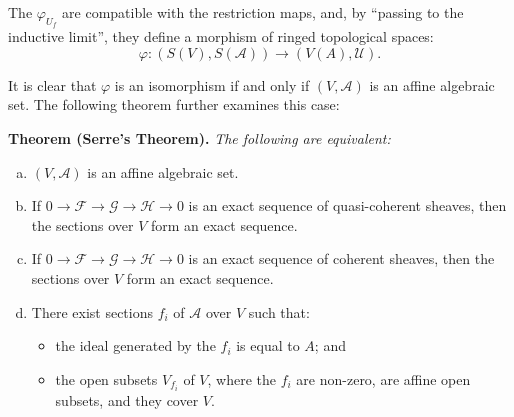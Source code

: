 \documentclass{article}
\newenvironment{itenv}[1]
  {\phantomsection\par\medskip\noindent\textbf{#1.}\itshape}
  {\medskip}
\newcommand{\scr}[1]{{\mathscr{#1}}}
\newcommand{\oldpage}[1]{\marginpar{\footnotesize$\Big\vert$ \textit{p.~#1}}}
\begin{document}
The $\varphi_{U_f}$ are compatible with the restriction maps, and, by ``passing to the inductive limit'', they define a morphism of ringed topological spaces:
\oldpage{2-05}
\[
  \varphi\colon (S(V),S(\scr{A})) \to (V(A),\scr{U}).
\]

It is clear that $\varphi$ is an isomorphism if and only if $(V,\scr{A})$ is an affine algebraic set.
The following theorem further examines this case:

\begin{itenv}{Theorem (Serre's Theorem)}
  The following are equivalent:
  \begin{enumerate}[(a)]
    \item $(V,\scr{A})$ is an affine algebraic set.
    \item If $0\to\scr{F}\to\scr{G}\to\scr{H}\to0$ is an exact sequence of quasi-coherent sheaves, then the sections over $V$ form an exact sequence.
    \item If $0\to\scr{F}\to\scr{G}\to\scr{H}\to0$ is an exact sequence of coherent sheaves, then the sections over $V$ form an exact sequence.
    \item There exist sections $f_i$ of $\scr{A}$ over $V$ such that:
      \begin{itemize}
        \item the ideal generated by the $f_i$ is equal to $A$; and
        \item the open subsets $V_{f_i}$ of $V$, where the $f_i$ are non-zero, are affine open subsets, and they cover $V$.
      \end{itemize}
  \end{enumerate}
\end{itenv}
\end{document}
